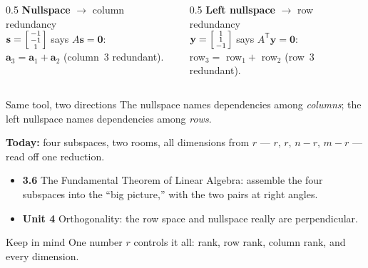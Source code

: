 \documentclass[aspectratio=169, 11pt]{beamer}
\newcommand{\yy}{\mathbf{y}}
\newcommand{\svec}{\mathbf{s}}
\newcommand{\zero}{\mathbf{0}}
\newcommand{\T}{\mathsf{T}}
\begin{document}
\begin{frame}[t, plain]
  \begin{columns}[T]
    \begin{column}{0.5\textwidth}
      \textbf{Nullspace} $\to$ column redundancy\\[4pt]
      $\svec=\begin{bsmallmatrix} -1\\-1\\1 \end{bsmallmatrix}$ says $A\svec=\zero$:\\[3pt]
      $\mathbf{a}_3=\mathbf{a}_1+\mathbf{a}_2$ (column~3 redundant).
    \end{column}
    \begin{column}{0.5\textwidth}
      \textbf{Left nullspace} $\to$ row redundancy\\[4pt]
      $\yy=\begin{bsmallmatrix} 1\\1\\-1 \end{bsmallmatrix}$ says $A^{\T}\yy=\zero$:\\[3pt]
      row$_3=$ row$_1+$ row$_2$ (row~3 redundant).
    \end{column}
  \end{columns}
  \vspace{6pt}
  \begin{block}{Same tool, two directions}
    The nullspace names dependencies among \emph{columns}; the left nullspace names dependencies among \emph{rows}.
  \end{block}
\end{frame}

\begin{frame}[t, plain]
  \textbf{Today:} four subspaces, two rooms, all dimensions from $r$ --- $r,\,r,\,n-r,\,m-r$ --- read off one
  reduction.\\[8pt]
  \begin{itemize}
    \setlength{\itemsep}{4pt}
    \item \textbf{3.6} The Fundamental Theorem of Linear Algebra: assemble the four subspaces into the ``big picture,'' with the two pairs at right angles.
    \item \textbf{Unit 4} Orthogonality: the row space and nullspace really are perpendicular.
  \end{itemize}
  \vspace{4pt}
  \begin{block}{Keep in mind}
    One number $r$ controls it all: rank, row rank, column rank, and every dimension.
  \end{block}
\end{frame}
\end{document}

